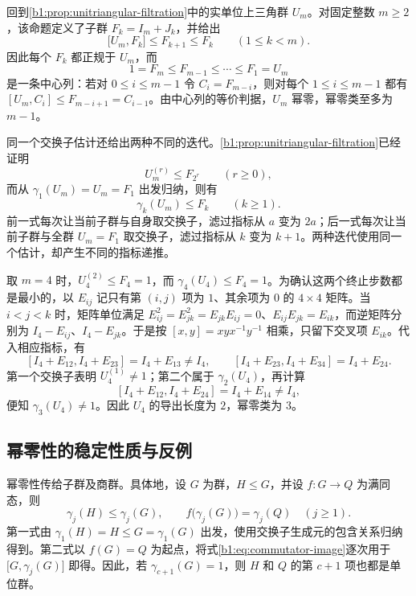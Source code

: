 回到\cref{b1:prop:unitriangular-filtration}中的实单位上三角群 \(U_m\)。对固定整数 \(m\ge2\)，该命题定义了子群 \(F_k=I_m+J_k\)，并给出
\[
	\bigl[U_m,F_k\bigr]\le F_{k+1}\le F_k \qquad(1\le k<m).
\]
因此每个 \(F_k\) 都正规于 \(U_m\)，而
\[
	1=F_m\le F_{m-1}\le\cdots\le F_1=U_m
\]
是一条中心列：若对 \(0\le i\le m-1\) 令 \(C_i=F_{m-i}\)，则对每个 \(1\le i\le m-1\) 都有 \([U_m,C_i]\le F_{m-i+1}=C_{i-1}\)。由中心列的等价判据，\(U_m\) 幂零，幂零类至多为 \(m-1\)。

\ProseParagraphBreak
同一个交换子估计还给出两种不同的迭代。\cref{b1:prop:unitriangular-filtration}已经证明
\[
	U_m^{(r)}\le F_{2^r}\qquad(r\ge0),
\]
而从 \(\gamma_1(U_m)=U_m=F_1\) 出发归纳，则有
\[
	\gamma_k(U_m)\le F_k\qquad(k\ge1).
\]
前一式每次让当前子群与自身取交换子，滤过指标从 \(a\) 变为 \(2a\)；后一式每次让当前子群与全群 \(U_m=F_1\) 取交换子，滤过指标从 \(k\) 变为 \(k+1\)。两种迭代使用同一个估计，却产生不同的指标递推。

\ProseParagraphBreak
取 \(m=4\) 时，\(U_4^{(2)}\le F_4=1\)，而 \(\gamma_4(U_4)\le F_4=1\)。为确认这两个终止步数都是最小的，以 \(E_{ij}\) 记只有第 \((i,j)\) 项为 \(1\)、其余项为 \(0\) 的 \(4\times4\) 矩阵。当 \(i<j<k\) 时，矩阵单位满足 \(E_{ij}^2=E_{jk}^2=E_{jk}E_{ij}=0\)、\(E_{ij}E_{jk}=E_{ik}\)，而逆矩阵分别为 \(I_4-E_{ij}\)、\(I_4-E_{jk}\)。于是按 \([x,y]=xyx^{-1}y^{-1}\) 相乘，只留下交叉项 \(E_{ik}\)。代入相应指标，有
\[
	[I_4+E_{12},I_4+E_{23}]=I_4+E_{13}\ne I_4, \qquad [I_4+E_{23},I_4+E_{34}]=I_4+E_{24}.
\]
第一个交换子表明 \(U_4^{(1)}\ne1\)；第二个属于 \(\gamma_2(U_4)\)，再计算
\[
	[I_4+E_{12},I_4+E_{24}]=I_4+E_{14}\ne I_4,
\]
便知 \(\gamma_3(U_4)\ne1\)。因此 \(U_4\) 的导出长度为 \(2\)，幂零类为 \(3\)。

\subsection{幂零性的稳定性质与反例}
\label{b1:subsec:0703:nilpotent-stability}

幂零性传给子群及商群。具体地，设 \(G\) 为群，\(H\le G\)，并设 \(f:G\rightarrow Q\) 为满同态，则
\begin{equation}\label{b1:eq:lower-central-functoriality}
	\gamma_j(H)\le\gamma_j(G),\qquad f\bigl(\gamma_j(G)\bigr)=\gamma_j(Q)\quad(j\ge1).
\end{equation}
第一式由 \(\gamma_1(H)=H\le G=\gamma_1(G)\) 出发，使用交换子生成元的包含关系归纳得到。第二式以 \(f(G)=Q\) 为起点，将式\eqref{b1:eq:commutator-image}逐次用于 \(\bigl[G,\gamma_j(G)\bigr]\) 即得。因此，若 \(\gamma_{c+1}(G)=1\)，则 \(H\) 和 \(Q\) 的第 \(c+1\) 项也都是单位群。

